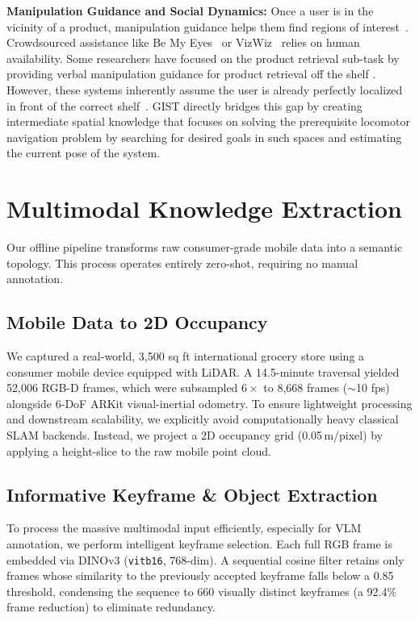 \documentclass[sigconf,anonymous,review]{acmart}
\begin{document}
\textbf{Manipulation Guidance and Social Dynamics:} Once a user is in the vicinity of a product, manipulation guidance helps them find regions of interest~\cite{vazquez2014assisted, bonani2018my}. Crowdsourced assistance like Be My Eyes~\cite{bemyeyes} or VizWiz~\cite{bigham2010vizwiz} relies on human availability. Some researchers have focused on the product retrieval sub-task by providing verbal manipulation guidance for product retrieval off the shelf \cite{agrawalShelfHelpEmpoweringHumans2023, agrawal2023assistive}. However, these systems inherently assume the user is already perfectly localized in front of the correct shelf~\cite{zientara2017third}. GIST directly bridges this gap by creating intermediate spatial knowledge that focuses on solving the prerequisite locomotor navigation problem by searching for desired goals in such spaces and estimating the current pose of the system.

\section{Multimodal Knowledge Extraction}

Our offline pipeline transforms raw consumer-grade mobile data into a semantic topology. This process operates entirely zero-shot, requiring no manual annotation.

\subsection{Mobile Data to 2D Occupancy}
We captured a real-world, 3,500 sq ft international grocery store using a consumer mobile device equipped with LiDAR. A 14.5-minute traversal yielded 52,006 RGB-D frames, which were subsampled $6\times$ to 8,668 frames ($\sim$10 fps) alongside 6-DoF ARKit visual-inertial odometry. To ensure lightweight processing and downstream scalability, we explicitly avoid computationally heavy classical SLAM backends. Instead, we project a 2D occupancy grid (0.05\,m/pixel) by applying a height-slice to the raw mobile point cloud.

\subsection{Informative Keyframe \& Object Extraction}
To process the massive multimodal input efficiently, especially for VLM annotation, we perform intelligent keyframe selection. Each full RGB frame is embedded via DINOv3 (\texttt{vitb16}, 768-dim). A sequential cosine filter retains only frames whose similarity to the previously accepted keyframe falls below a 0.85 threshold, condensing the sequence to 660 visually distinct keyframes (a 92.4\% frame reduction) to eliminate redundancy.
\end{document}
